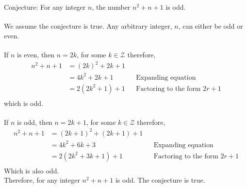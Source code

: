 \documentclass[a4paper]{article}
\begin{document}
Conjecture: For any integer $n$, the number $n^2 + n + 1$ is odd. \\\\
We assume the conjecture is true. Any arbitrary integer, $n$, can either be odd or even. \\\\
If $n$ is even, then $n = 2k$, for some $k \in \mathcal{Z}$ therefore,
\begin{align*}
n^2 + n + 1 & = (2k)^2 + 2k + 1\\
& = 4k^2 + 2k + 1 && \text{Expanding equation} \\
& = 2(2k^2 + 1) + 1 && \text{Factoring to the form $2r + 1$} \\
\end{align*}
which is odd. \\\\
If $n$ is odd, then $n = 2k + 1$, for some $k \in \mathcal{Z}$ therefore,
\begin{align*}
n^2 + n + 1 & = (2k + 1)^2 + (2k + 1) + 1\\
& = 4k^2 + 6k + 3 && \text{Expanding equation} \\
& = 2(2k^2 + 3k + 1) + 1 && \text{Factoring to the form $2r + 1$} \\
\end{align*}
Which is also odd.\\
Therefore, for any integer $n^2 + n + 1$ is odd. The conjecture is true.
\end{document}
